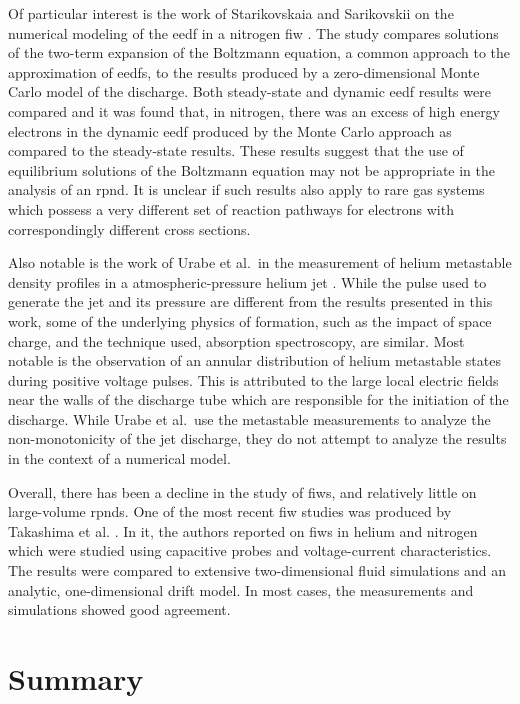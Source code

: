 Of particular interest is the work of Starikovskaia and Sarikovskii on the
numerical modeling of the \acs{eedf} in a nitrogen \acs{fiw}
\cite{Starikovskaia2001}. The study compares solutions of the two-term expansion
of the Boltzmann equation, a common approach to the approximation of
\acs{eedf}s, to the results produced by a zero-dimensional Monte Carlo model of
the discharge. Both steady-state and dynamic \acs{eedf} results were compared
and it was found that, in nitrogen, there was an excess of high energy electrons
in the dynamic \acs{eedf} produced by the Monte Carlo approach as compared to
the steady-state results. These results suggest that the use of equilibrium
solutions of the Boltzmann equation may not be appropriate in the analysis of an
\acs{rpnd}. It is unclear if such results also apply to rare gas systems which
possess a very different set of reaction pathways for electrons with
correspondingly different cross sections.

Also notable is the work of Urabe et al.\ in the measurement of helium metastable
density profiles in a atmospheric-pressure helium jet \cite{Urabe2010}. While
the pulse used to generate the jet and its pressure are different from the
results presented in this work, some of the underlying physics of formation,
such as the impact of space charge, and the technique used, absorption
spectroscopy, are similar. Most notable is the observation of an annular
distribution of helium metastable states during positive voltage pulses. This is
attributed to the large local electric fields near the walls of the discharge
tube which are responsible for the initiation of the discharge. While Urabe et
al.\ use the metastable measurements to analyze the non-monotonicity of the jet
discharge, they do not attempt to analyze the results in the context of a
numerical model.

Overall, there has been a decline in the study of \acs{fiw}s, and relatively
little on large-volume \acs{rpnd}s. One of the most recent \acs{fiw} studies was
produced by Takashima et al. \cite{Takashima2011}. In it, the authors reported
on \acs{fiw}s in helium and nitrogen which were studied using capacitive probes
and voltage-current characteristics. The results were compared to extensive
two-dimensional fluid simulations and an analytic, one-dimensional drift model.
In most cases, the measurements and simulations showed good agreement.

\section{Summary}

